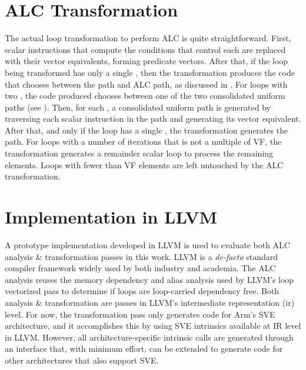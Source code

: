 \section{ALC Transformation}
\label{sec:alc-transformation}

The actual loop transformation to perform ALC is quite straightforward.
First, scalar instructions that compute the conditions that control each \cpath are replaced with their vector equivalents, forming predicate vectors.
After that, if the loop being transformed has only a single \cpath, then the transformation produces the code that chooses between the \ifconverted path and ALC path, as discussed in .
For loops with two \cpaths, the code produced chooses between one of the two consolidated uniform paths (see ).
Then, for each \cpath, a consolidated uniform path is generated by traversing each scalar instruction in the path and generating its vector equivalent.
After that, and only if the loop has a single \cpath, the transformation generates the \ifconverted path.
For loops with a number of iterations that is not a multiple of VF, the transformation generates a remainder scalar loop to process the remaining elements.
Loops with fewer than VF elements are left untouched by the ALC transformation.

\section{Implementation in LLVM}

A prototype implementation developed in LLVM is used to  evaluate both ALC analysis \& transformation passes in this work.
LLVM is a \emph{de-facto} standard compiler framework widely used by both industry and academia.
The ALC analysis reuses the memory dependency and alias analysis used by LLVM's loop vectorized pass to determine if loops are loop-carried dependency free.
Both analysis \& transformation are passes in LLVM's intermediate representation (\acrshort{ir}) level.
For now, the transformation pass only generates code for Arm's SVE architecture, and it accomplishes this by using SVE intrinsics available at IR level in LLVM.
However, all architecture-specific intrinsic calls are generated through an interface that, with minimum effort, can be extended to generate code for other architectures that also support SVE.

